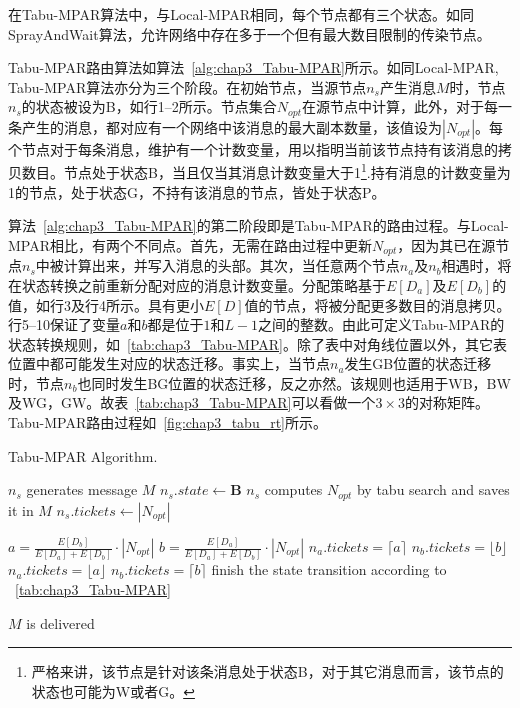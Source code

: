在Tabu-MPAR算法中，与Local-MPAR相同，每个节点都有三个状态。如同SprayAndWait算法，允许网络中存在多于一个但有最大数目限制的传染节点。

Tabu-MPAR路由算法如算法~\ref{alg:chap3_Tabu-MPAR}所示。如同Local-MPAR, Tabu-MPAR算法亦分为三个阶段。在初始节点，当源节点$n_s$产生消息$M$时，节点$n_s$的状态被设为B，如行1--2所示。节点集合$N_{opt}$在源节点中计算，此外，对于每一条产生的消息，都对应有一个网络中该消息的最大副本数量，该值设为$|N_{opt}|$。每个节点对于每条消息，维护有一个计数变量，用以指明当前该节点持有该消息的拷贝数目。节点处于状态B，当且仅当其消息计数变量大于1\footnote{严格来讲，该节点是针对该条消息处于状态B，对于其它消息而言，该节点的状态也可能为W或者G。}.持有消息的计数变量为1的节点，处于状态G，不持有该消息的节点，皆处于状态P。

算法~\ref{alg:chap3_Tabu-MPAR}的第二阶段即是Tabu-MPAR的路由过程。与Local-MPAR相比，有两个不同点。首先，无需在路由过程中更新$N_{opt}$，因为其已在源节点$n_s$中被计算出来，并写入消息的头部。其次，当任意两个节点$n_a$及$n_b$相遇时，将在状态转换之前重新分配对应的消息计数变量。分配策略基于$E[D_a]$及$E[D_b]$的值，如行3及行4所示。具有更小$E[D]$值的节点，将被分配更多数目的消息拷贝。行5--10保证了变量$a$和$b$都是位于$1$和$L-1$之间的整数。由此可定义Tabu-MPAR的状态转换规则，如\tablename~\ref{tab:chap3_Tabu-MPAR}。除了表中对角线位置以外，其它表位置中都可能发生对应的状态迁移。事实上，当节点$n_a$发生GB位置的状态迁移时，节点$n_b$也同时发生BG位置的状态迁移，反之亦然。该规则也适用于WB，BW及WG，GW。故表\tablename~\ref{tab:chap3_Tabu-MPAR}可以看做一个$3\times 3$的对称矩阵。Tabu-MPAR路由过程如\figurename~\ref{fig:chap3_tabu_rt}所示。

\begin{algorithm}[htbp] %
\renewcommand{\algorithmicensure}{\textbf{Initial Stage:}}
\caption{Tabu-MPAR Algorithm.} %
\label{alg:chap3_Tabu-MPAR} %
\begin{algorithmic}[1] %
\ENSURE
\STATE $n_s$ generates message $M$
\STATE $n_s.state\leftarrow$\textbf{B}
\STATE $n_s$ computes $N_{opt}$ by tabu search and saves it in $M$
\STATE $n_s.tickets\leftarrow |N_{opt}|$
\end{algorithmic} %
\begin{algorithmic}[1] %
\renewcommand{\algorithmicensure}{\textbf{Routing Stage:}}
\ENSURE
{}
        \STATE $a=\frac{E[D_b]}{E[D_a]+E[D_b]}\cdot |N_{opt}|$
        \STATE $b=\frac{E[D_a]}{E[D_a]+E[D_b]}\cdot |N_{opt}|$
            \STATE $n_a.tickets=\lceil a \rceil$
            \STATE $n_b.tickets=\lfloor b \rfloor$
        \ELSE
            \STATE $n_a.tickets=\lfloor a \rfloor$
            \STATE $n_b.tickets=\lceil b \rceil$
        \ENDIF
        \STATE finish the state transition according to \tablename~\ref{tab:chap3_Tabu-MPAR}
    \ENDIF
\ENDFOR
\end{algorithmic}
\begin{algorithmic}[1]
\renewcommand{\algorithmicensure}{\textbf{End Stage:}}
\ENSURE
\STATE $M$ is delivered
\end{algorithmic}
\end{algorithm}


